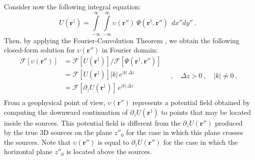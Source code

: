 Consider now the following integral equation:
\begin{equation}
	U(\mathbf{r}^{\dagger}) = 
	\int\limits_{-\infty}^{\infty} \int\limits_{-\infty}^{\infty}
	\upsilon(\mathbf{r}'') \:
	\Psi(\mathbf{r}^{\dagger}, \mathbf{r}'') 
	\:\: dx''dy'' \: .
	\label{eq:U-upsilon}
\end{equation}
Then, by applying the Fourier-Convolution Theorem \cite[][ p. 268]{blakely1996},
we obtain the following closed-form solution for 
$\upsilon(\mathbf{r}'')$ in Fourier domain:
\begin{equation}
	\begin{split}
		\mathcal{F} \left[ \upsilon(\mathbf{r}'') \right] 
		&= \mathcal{F} \left[ U(\mathbf{r}^{\dagger}) \right] {\Big /}
		\mathcal{F} \left[ \Psi(\mathbf{r}^{\dagger}, \mathbf{r}'') \right] \\
		&= \mathcal{F} \left[ U(\mathbf{r}^{\dagger}) \right] 
		\vert k \vert \, e^{\vert k \vert \, \Delta z} \\
		&= \mathcal{F} \left[ \partial_{z} U(\mathbf{r}^{\dagger}) \right] 
		\, e^{\vert k \vert \, \Delta z} \\
	\end{split} \quad , \quad \Delta z > 0 \: , \quad \vert k \vert \ne 0 \: ,
\label{eq:Fourier-U-upsilon}
\end{equation}
From a geophysical point of view, $\upsilon(\mathbf{r}'')$ represents a  
potential field obtained by computing the downward continuation of 
$\partial_{z} U(\mathbf{r}^{\dagger})$ to points that may be located inside the sources. 
This potential field is different from the $\partial_{z} U(\mathbf{r}'')$ produced by 
the true 3D sources on the plane $z''_{0}$ for the case in which this plane crosses 
the sources.
Note that $\upsilon(\mathbf{r}'')$ is equal to $\partial_{z} U(\mathbf{r}'')$ for the 
case in which the horizontal plane $z''_{0}$ is located above the sources.

